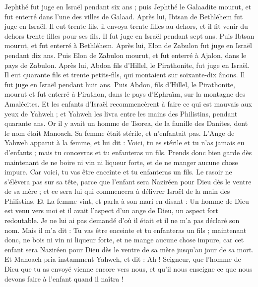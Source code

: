 \begin{multicols}{2}
Jephthé fut juge en Israël pendant six ans ; puis Jephthé le Galaadite mourut, et fut enterré dans l'une des villes de Galaad.
Après lui, Ibtsan de Bethléhem fut juge en Israël.
Il eut trente fils, il envoya trente filles au-dehors, et il fit venir du dehors trente filles pour ses fils. Il fut juge en Israël pendant sept ans.
Puis Ibtsan mourut, et fut enterré à Bethléhem.
Après lui, Elon de Zabulon fut juge en Israël pendant dix ans.
Puis Elon de Zabulon mourut, et fut enterré à Ajalon, dans le pays de Zabulon.
Après lui, Abdon fils d'Hillel, le Pirathonite, fut juge en Israël.
Il eut quarante fils et trente petits-fils, qui montaient sur soixante-dix ânons. Il fut juge en Israël pendant huit ans.
Puis Abdon, fils d'Hillel, le Pirathonite, mourut et fut enterré à Pirathon, dans le pays d'Ephraïm, sur la montagne des Amalécites.
\VerseOne{}Et les enfants d'Israël recommencèrent à faire ce qui est mauvais aux yeux de Yahweh ; et Yahweh les livra entre les mains des Philistins, pendant quarante ans.
Or il y avait un homme de Tsorea, de la famille des Danites, dont le nom était Manoach. Sa femme était stérile, et n'enfantait pas.
L'Ange de Yahweh apparut à la femme, et lui dit : Voici, tu es stérile et tu n'as jamais eu d'enfants ; mais tu concevras et tu enfanteras un fils.
Prends donc bien garde dès maintenant de ne boire ni vin ni liqueur forte, et de ne manger aucune chose impure.
Car voici, tu vas être enceinte et tu enfanteras un fils. Le rasoir ne s'élèvera pas sur sa tête, parce que l'enfant sera Naziréen pour Dieu dès le ventre de sa mère ; et ce sera lui qui commencera à délivrer Israël de la main des Philistins.
Et La femme vint, et parla à son mari en disant : Un homme de Dieu est venu vers moi et il avait l'aspect d'un ange de Dieu, un aspect fort redoutable. Je ne lui ai pas demandé d'où il était et il ne m'a pas déclaré son nom.
Mais il m'a dit : Tu vas être enceinte et tu enfanteras un fils ; maintenant donc, ne bois ni vin ni liqueur forte, et ne mange aucune chose impure, car cet enfant sera Naziréen pour Dieu dès le ventre de sa mère jusqu'au jour de sa mort.
Et Manoach pria instamment Yahweh, et dit : Ah ! Seigneur, que l'homme de Dieu que tu as envoyé vienne encore vers nous, et qu'il nous enseigne ce que nous devons faire à l'enfant quand il naîtra !

\end{multicols}
